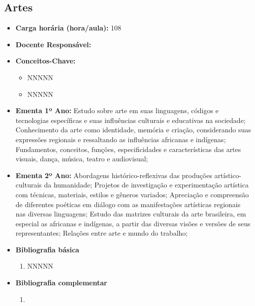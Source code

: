 \documentclass[11pt,fleqn]{book} %
\begin{document}
\subsection{Artes}\label{disc:artes}
\begin{itemize}
	\item \textbf{Carga horária (hora/aula):} 108
	\item \textbf{Docente Responsável:}
	\item \textbf{Conceitos-Chave:}
	\begin{itemize}
		\item NNNNN
		\item NNNNN
	\end{itemize}

	\item \textbf{Ementa 1º Ano:}
	Estudo sobre arte em suas linguagens, códigos e tecnologias específicas e suas influências culturais e educativas na sociedade;
	Conhecimento da arte como identidade, memória e criação, considerando suas expressões regionais e ressaltando as influências africanas e indígenas;
	Fundamentos, conceitos, funções, especificidades e características das artes visuais, dança, música, teatro e audiovisual;
	\item \textbf{Ementa 2º Ano:}
	Abordagens histórico-reflexivas das produções artístico-culturais da humanidade;
	Projetos de investigação e experimentação artística com técnicas, materiais, estilos e gêneros variados;
	Apreciação e compreensão de diferentes poéticas em diálogo com as manifestações artísticas regionais nas diversas linguagens;
	Estudo das matrizes culturais da arte brasileira, em especial as africanas e indígenas, a partir das diversas visões e versões de seus representantes;
	Relações entre arte e mundo do trabalho;
	\item \textbf{Bibliografia básica}
	\begin{enumerate}
		\item NNNNN
	\end{enumerate}
	\item \textbf{Bibliografia complementar}
	\begin{enumerate}
		\item 
	\end{enumerate}	
\end{itemize}

\newpage
\end{document}
